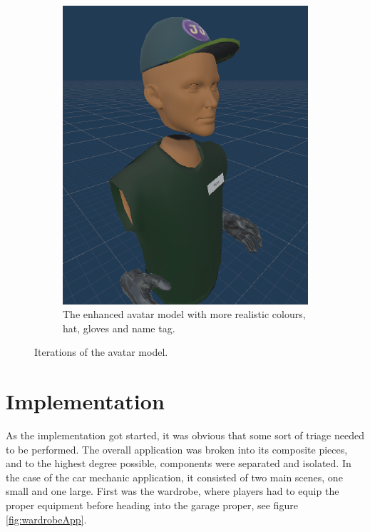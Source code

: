 \begin{figure}[]
\begin{subfigure}[b]{0.4\textwidth}
    \includegraphics[width=1\textwidth]{fig/phase_2/implementation/avatarModel.PNG}
    \caption{The enhanced avatar model with more realistic colours, hat, gloves and name tag.}
    \label{fig:newAvatar}
  \end{subfigure}
  \hfill%
  \caption{Iterations of the avatar model.}
  \label{fig:phase2Avatars}
\end{figure}


\section{Implementation}
\label{section:Phase2Implentation}
As the implementation got started, it was obvious that some sort of triage needed to be performed. The overall application was broken into its composite pieces, and to the highest degree possible, components were separated and isolated. In the case of the car mechanic application, it consisted of two main scenes, one small and one large. First was the wardrobe, where players had to equip the proper equipment before heading into the garage proper, see figure \ref{fig:wardrobeApp}.


